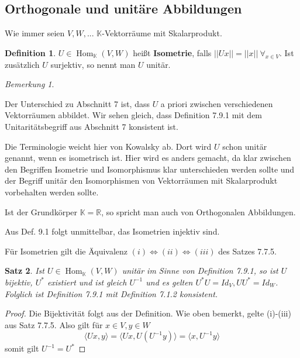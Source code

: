 \documentclass[12pt,a4paper]{article}
\newtheorem{theorem}{Satz}
\theoremstyle{definition}
\newtheorem{definition}[theorem]{Definition}
\theoremstyle{remark}
\newtheorem*{remark}{Bemerkung}
\DeclareMathOperator{\Hom}{Hom}
\begin{document}
	\subsection{Orthogonale und unitäre Abbildungen}
	Wie immer seien $V,W,...$ $\mathbb{K}$-Vektorräume mit Skalarprodukt. \\
	\begin{definition}
		$U \in \Hom_{\mathbb{K}}(V,W)$ heißt \textbf{Isometrie}, falls $||Ux||=||x|| \ \forall_{x \in V}$.
		Ist zusätzlich $U$ surjektiv, so nennt man $U$ unitär.
	\end{definition}
	\begin{remark}
		\begin{proofenum}
			\item Der Unterschied zu Abschnitt 7 ist, dass $U$ a priori zwischen verschiedenen Vektorräumen abbildet. Wir sehen gleich, dass Definition 7.9.1 mit dem Unitaritätsbegriff aus Abschnitt 7 konsistent ist.
			\item Die Terminologie weicht hier von Kowalsky ab. Dort wird $U$ schon unitär genannt, wenn es isometrisch ist. Hier wird es anders gemacht, da klar zwischen den Begriffen Isometrie und Isomorphismus klar unterschieden werden sollte und der Begriff unitär  den Isomorphismen von Vektorräumen mit Skalarprodukt vorbehalten werden sollte.
			\item Ist der Grundkörper $ \mathbb{K}=\mathbb{R}$, so spricht man auch von Orthogonalen Abbildungen.
			\item Aus Def. 9.1 folgt unmittelbar, das Isometrien injektiv sind. 
			\item Für Isometrien gilt die Äquivalenz $(i) \Leftrightarrow (ii) \Leftrightarrow (iii)$ des Satzes 7.7.5.
		\end{proofenum}
	\end{remark}
	\begin{theorem}
		Ist $U \in \Hom_{\mathbb{K}}(V,W)$ unitär im Sinne von Definition 7.9.1, so ist $U$ bijektiv, $U^*$ existiert und ist gleich $U^{-1}$ und es gelten $U^*U=Id_{V}, UU^*= Id_W$. \\
		Folglich ist Definition 7.9.1 mit Definition 7.1.2 konsistent.
	\end{theorem}
	\begin{proof}
		Die Bijektivität folgt aus der Definition. Wie oben bemerkt, gelte (i)-(iii) aus Satz 7.7.5. Also gilt für $x \in V, y \in W$
		\begin{equation}
			\langle Ux,y \rangle = \langle Ux,U(U^{-1}y) \rangle = \langle x, U^{-1}y \rangle
		\end{equation}
		somit gilt $U^{-1} = U^*$
	\end{proof}
\end{document}
